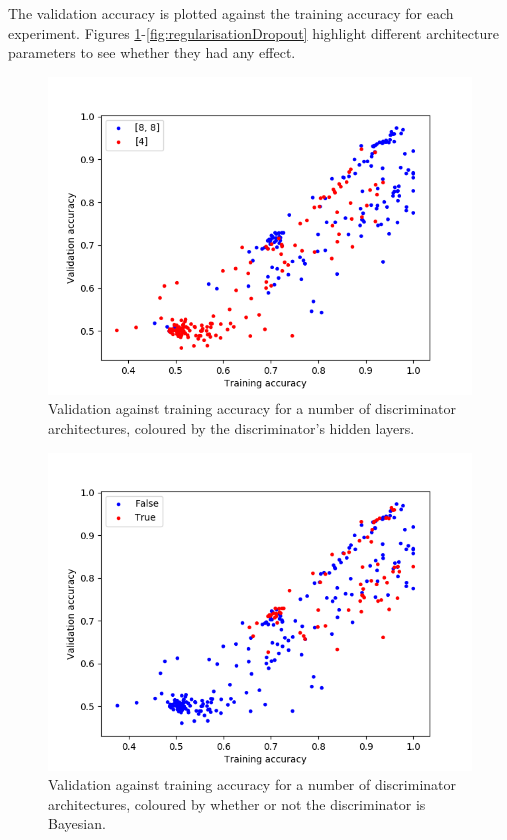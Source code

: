\documentclass[a4paper]{article}
\begin{document}
The validation accuracy is plotted against the training accuracy for each experiment.
Figures \ref{fig:regularisationNetworkShape}-\ref{fig:regularisationDropout} highlight different architecture parameters to see whether they had any effect.

\begin{figure}
  \centering
  \includegraphics[scale=0.75]{../../figures/circlesobjective/validation_vs_training_network_shape.png}
  \caption{Validation against training accuracy for a number of discriminator architectures,
    coloured by the discriminator's hidden layers.}
  \label{fig:regularisationNetworkShape}
  \end{figure}

\begin{figure}
  \centering
  \includegraphics[scale=0.75]{../../figures/circlesobjective/validation_vs_training_bayesian_network.png}
  \caption{Validation against training accuracy for a number of discriminator architectures,
    coloured by whether or not the discriminator is Bayesian.}
  \label{fig:regularisationBayesianNetwork}
  \end{figure}
\end{document}
